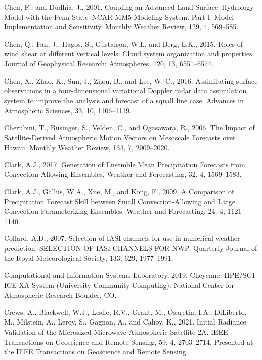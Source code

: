 \documentclass[12pt,oneside]{reedthesis}
\begin{document}
\leavevmode\hypertarget{ref-chen2001}{}%
Chen, F., and Dudhia, J., 2001. Coupling an Advanced Land Surface--Hydrology Model with the Penn State--NCAR MM5 Modeling System. Part I: Model Implementation and Sensitivity. Monthly Weather Review, 129, 4, 569--585.

\leavevmode\hypertarget{ref-chen2015}{}%
Chen, Q., Fan, J., Hagos, S., Gustafson, W.I., and Berg, L.K., 2015. Roles of wind shear at different vertical levels: Cloud system organization and properties. Journal of Geophysical Research: Atmospheres, 120, 13, 6551--6574.

\leavevmode\hypertarget{ref-chen2016}{}%
Chen, X., Zhao, K., Sun, J., Zhou, B., and Lee, W.-C., 2016. Assimilating surface observations in a four-dimensional variational Doppler radar data assimilation system to improve the analysis and forecast of a squall line case. Advances in Atmospheric Sciences, 33, 10, 1106--1119.

\leavevmode\hypertarget{ref-cherubini2006}{}%
Cherubini, T., Businger, S., Velden, C., and Ogasawara, R., 2006. The Impact of Satellite-Derived Atmospheric Motion Vectors on Mesoscale Forecasts over Hawaii. Monthly Weather Review, 134, 7, 2009--2020.

\leavevmode\hypertarget{ref-clark2017}{}%
Clark, A.J., 2017. Generation of Ensemble Mean Precipitation Forecasts from Convection-Allowing Ensembles. Weather and Forecasting, 32, 4, 1569--1583.

\leavevmode\hypertarget{ref-clark2009}{}%
Clark, A.J., Gallus, W.A., Xue, M., and Kong, F., 2009. A Comparison of Precipitation Forecast Skill between Small Convection-Allowing and Large Convection-Parameterizing Ensembles. Weather and Forecasting, 24, 4, 1121--1140.

\leavevmode\hypertarget{ref-collard2007}{}%
Collard, A.D., 2007. Selection of IASI channels for use in numerical weather prediction: SELECTION OF IASI CHANNELS FOR NWP. Quarterly Journal of the Royal Meteorological Society, 133, 629, 1977--1991.

\leavevmode\hypertarget{ref-Cheyenne2019}{}%
Computational and Information Systems Laboratory, 2019. Cheyenne: HPE/SGI ICE XA System (University Community Computing). National Center for Atmospheric Research Boulder, CO.

\leavevmode\hypertarget{ref-crews2021}{}%
Crews, A., Blackwell, W.J., Leslie, R.V., Grant, M., Osaretin, I.A., DiLiberto, M., Milstein, A., Leroy, S., Gagnon, A., and Cahoy, K., 2021. Initial Radiance Validation of the Microsized Microwave Atmospheric Satellite-2A. IEEE Transactions on Geoscience and Remote Sensing, 59, 4, 2703--2714. Presented at the IEEE Transactions on Geoscience and Remote Sensing.
\end{document}
